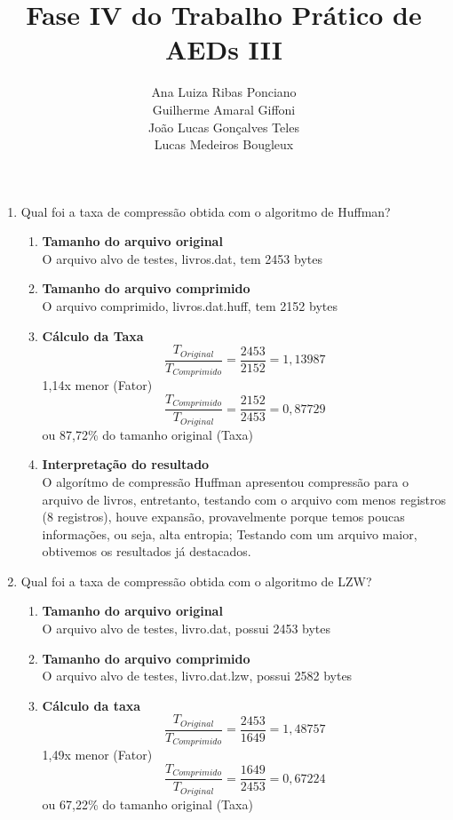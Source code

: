 \documentclass[12pt]{article}
\title{\textbf{Fase IV do Trabalho Prático de AEDs III}}
\author{
    Ana Luiza Ribas Ponciano \\
    Guilherme Amaral Giffoni \\
    João Lucas Gonçalves Teles \\
    Lucas Medeiros Bougleux
}
\begin{document}
\maketitle

\begin{enumerate}
    \item Qual foi a taxa de compressão obtida com o algoritmo de Huffman?
    \begin{enumerate}
        \item \textbf{Tamanho do arquivo original} \\
        O arquivo alvo de testes, livros.dat, tem 2453 bytes

        \item \textbf{Tamanho do arquivo comprimido} \\
        O arquivo comprimido, livros.dat.huff, tem 2152 bytes

        \item \textbf{Cálculo da Taxa} \\
        $$ \frac{T_{Original}}{T_{Comprimido}} = \frac{2453}{2152} = 1,13987 $$
        1,14x menor (Fator)
        $$ \frac{T_{Comprimido}}{T_{Original}} = \frac{2152}{2453} = 0,87729 $$
        ou 87,72\% do tamanho original (Taxa)

        \item \textbf{Interpretação do resultado} \\
        O algorítmo de compressão Huffman apresentou compressão para o arquivo de livros, entretanto, testando com o arquivo com menos registros (8 registros), houve expansão, provavelmente porque temos poucas informações, ou seja, alta entropia; Testando com um arquivo maior, obtivemos os resultados já destacados.
    \end{enumerate}

    \newpage

    \item Qual foi a taxa de compressão obtida com o algoritmo de LZW?
    \begin{enumerate}
        \item \textbf{Tamanho do arquivo original} \\
        O arquivo alvo de testes, livro.dat, possui 2453 bytes

        \item \textbf{Tamanho do arquivo comprimido} \\
        O arquivo alvo de testes, livro.dat.lzw, possui 2582 bytes

        \item \textbf{Cálculo da taxa} \\
        $$ \frac{T_{Original}}{T_{Comprimido}} = \frac{2453}{1649} = 1,48757 $$
        1,49x menor (Fator)
        $$ \frac{T_{Comprimido}}{T_{Original}} = \frac{1649}{2453} = 0,67224 $$
        ou 67,22\% do tamanho original (Taxa)


\end{enumerate}
\end{enumerate}
\end{document}
